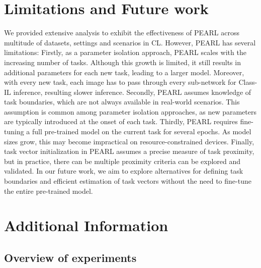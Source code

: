 \documentclass[10pt]{article} %
\begin{document}



\appendix


\section{Limitations and Future work}
We provided extensive analysis to exhibit the effectiveness of PEARL across multitude of datasets, settings and scenarios in CL. However, PEARL has several limitations: Firstly, as a parameter isolation approach, PEARL scales with the increasing number of tasks. Although this growth is limited, it still results in additional parameters for each new task, leading to a larger model. Moreover, with every new task, each image has to pass through every sub-network for Class-IL inference, resulting slower inference.  Secondly, PEARL assumes knowledge of task boundaries, which are not always available in real-world scenarios. This assumption is common among parameter isolation approaches, as new parameters are typically introduced at the onset of each task.
Thirdly, PEARL requires fine-tuning a full pre-trained model on the current task for several epochs. As model sizes grow, this may become impractical on resource-constrained devices. Finally, task vector initialization in PEARL assumes a precise measure of task proximity, but in practice, there can be multiple proximity criteria can be explored and validated. 
In our future work, we aim to explore alternatives for defining task boundaries and efficient estimation of task vectors without the need to fine-tune the entire pre-trained model.










\section{Additional Information}

\subsection{Overview of experiments}\label{appendix:overview_expts}
\end{document}

